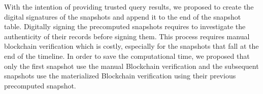 		With the intention of providing trusted query results, we proposed to create the digital signatures of the snapshots and append it to the end of the snapshot table. Digitally signing the precomputed snapshots requires to investigate the authenticity of their records before signing them. This process requires manual blockchain verification which is costly, especially for the snapshots that fall at the end of the timeline. In order to save the computational time, we proposed that only the first snapshot use the manual Blockchain verification and the subsequent snapshots use the materialized Blockchain verification using their previous precomputed snapshot. 

